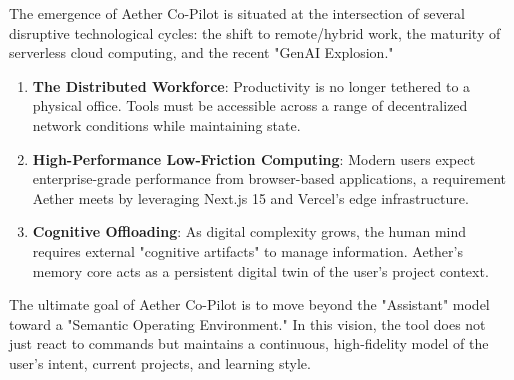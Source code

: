 The emergence of Aether Co-Pilot is situated at the intersection of several disruptive technological cycles: the shift to remote/hybrid work, the maturity of serverless cloud computing, and the recent "GenAI Explosion." 
\begin{enumerate}
    \item \textbf{The Distributed Workforce}: Productivity is no longer tethered to a physical office. Tools must be accessible across a range of decentralized network conditions while maintaining state.
    \item \textbf{High-Performance Low-Friction Computing}: Modern users expect enterprise-grade performance from browser-based applications, a requirement Aether meets by leveraging Next.js 15 and Vercel's edge infrastructure.
    \item \textbf{Cognitive Offloading}: As digital complexity grows, the human mind requires external "cognitive artifacts" to manage information. Aether's memory core acts as a persistent digital twin of the user's project context.
\end{enumerate}

The ultimate goal of Aether Co-Pilot is to move beyond the "Assistant" model toward a "Semantic Operating Environment." In this vision, the tool does not just react to commands but maintains a continuous, high-fidelity model of the user's intent, current projects, and learning style.

\newpage

